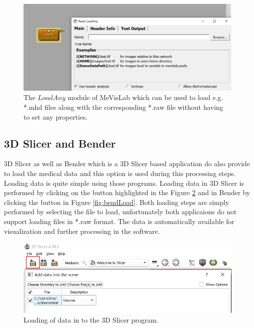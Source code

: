 \begin{figure} [!htb]
    \centering
	\includegraphics[width=12cm]{content/images/meLoadAny}
	\caption{The $LoadAny$ module of MeVisLab which can be used to load e.g. *.mhd files along with the corresponding *.raw file without having to set any properties.} 
	\label{fig:meLoadAny}
\end{figure}

\newpage
\subsection{3D Slicer and Bender}

3D Slicer \cite{Slicer3DSlicer,Fedorov20123DNetwork} as well as Bender \cite{Finet2014Bender:Morphing} which is a 3D Slicer based application do also provide to load the medical data and this option is used during this processing steps. Loading data is quite simple using those programs. Loading data in 3D Slicer is performed by clicking on the button highlighted in the Figure \ref{fig:slcLoad} and in Bender by clicking the button in Figure \ref{fig:bendLoad}. Both loading steps are simply performed by selecting the file to load, unfortunately both applicaions do not support loading files in *.raw format. The data is automatically available for visualization and further processing in the software.

\begin{figure} [!htb]
    \centering
	\includegraphics[width=12cm]{content/images/slcLoad}
	\caption{Loading of data in to the 3D Slicer program.} 
	\label{fig:slcLoad}
\end{figure}

